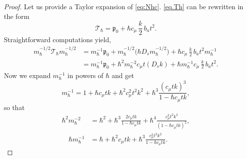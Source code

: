 \documentclass[10pt]{amsart}
\theoremstyle{plain}
\theoremstyle{definition}
\begin{document}
\begin{proof}
Let us provide a Taylor expansion of \eqref{eq:Nhc}. \eqref{eq.Th} can be rewritten in the form
\[
\mathcal T_{\hbar}= \mathfrak{p}_0+\hbar c_\mu\,\frac{k}{2}\,b_at^2.
\]
Straightforward computations yield,
\[
\begin{aligned}
m_\hbar^{-1/2}\mathcal T_{\hbar} m_\hbar^{-1/2}&=m_\hbar^{-1}\mathfrak p_0+m_\hbar^{-1/2}\bigl(\hbar D_s m_\hbar^{-1/2}\bigr)+\hbar c_\mu\,\frac{k}{2}\,b_at^2 m_\hbar^{-1}\\
&=m_\hbar^{-1}\mathfrak p_0+\hbar^2 m_\hbar^{-2} c_\mu t(D_sk)+\hbar m_\hbar^{-1}c_\mu\,\frac{k}{2}\,b_at^2 .
\end{aligned}
\]
Now we expand $m_\hbar^{-1}$ in powers of $\hbar$ and get
\[
m_\hbar^{-1}=1+\hbar c_\mu tk+\hbar^2c_\mu^2t^2k^2+\hbar^3\frac{(c_\mu t k)^3}{1-\hbar c_\mu t k},
\]
so that
\[
\begin{aligned}
\hbar^2m_\hbar^{-2}&=\hbar^2+\hbar^3\frac{2c_\mu tk}{1-\hbar c_\mu tk}+\hbar^4\frac{c_\mu^2t^2k^2}{(1-\hbar c_\mu tk)^2},\\
\quad
\hbar m_\hbar^{-1}&=\hbar+\hbar^2 c_\mu tk+\hbar^3\frac{c_\mu^2t^2k^2}{1-\hbar c_\mu t k}.
\end{aligned}
\]


\end{proof}
\end{document}
